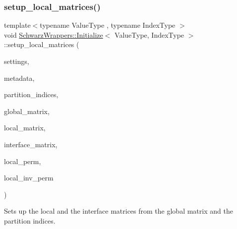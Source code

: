 \mbox{\label{classSchwarzWrappers_1_1Initialize_a67029ec6f266735f579b219402bf317a}} 
\subsubsection{\texorpdfstring{setup\+\_\+local\+\_\+matrices()}{setup\_local\_matrices()}}
{\footnotesize\ttfamily template$<$typename Value\+Type , typename Index\+Type $>$ \\
void \hyperlink{classSchwarzWrappers_1_1Initialize}{Schwarz\+Wrappers\+::\+Initialize}$<$ Value\+Type, Index\+Type $>$\+::setup\+\_\+local\+\_\+matrices (\begin{DoxyParamCaption}\item[{\hyperlink{structSchwarzWrappers_1_1Settings}{Settings} \&}]{settings,  }\item[{\hyperlink{structSchwarzWrappers_1_1Metadata}{Metadata}$<$ Value\+Type, Index\+Type $>$ \&}]{metadata,  }\item[{std\+::vector$<$ unsigned int $>$ \&}]{partition\+\_\+indices,  }\item[{std\+::shared\+\_\+ptr$<$ gko\+::matrix\+::\+Csr$<$ Value\+Type, Index\+Type $>$$>$ \&}]{global\+\_\+matrix,  }\item[{std\+::shared\+\_\+ptr$<$ gko\+::matrix\+::\+Csr$<$ Value\+Type, Index\+Type $>$$>$ \&}]{local\+\_\+matrix,  }\item[{std\+::shared\+\_\+ptr$<$ gko\+::matrix\+::\+Csr$<$ Value\+Type, Index\+Type $>$$>$ \&}]{interface\+\_\+matrix,  }\item[{std\+::shared\+\_\+ptr$<$ gko\+::matrix\+::\+Permutation$<$ Index\+Type $>$$>$ \&}]{local\+\_\+perm,  }\item[{std\+::shared\+\_\+ptr$<$ gko\+::matrix\+::\+Permutation$<$ Index\+Type $>$$>$ \&}]{local\+\_\+inv\+\_\+perm }\end{DoxyParamCaption})\hspace{0.3cm}{\ttfamily [pure virtual]}}



Sets up the local and the interface matrices from the global matrix and the partition indices. 


